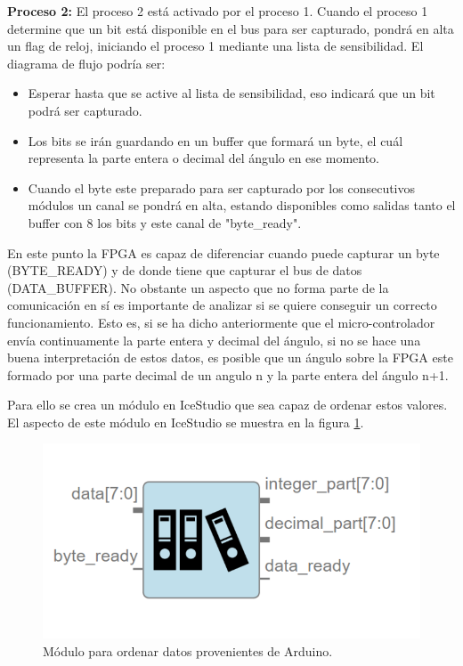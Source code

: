 \textbf{Proceso 2:} El proceso 2 está activado por el proceso 1. Cuando el proceso 1 determine que un bit está disponible en el bus para ser capturado, pondrá en alta un flag de reloj, iniciando el proceso 1 mediante una lista de sensibilidad. El diagrama de flujo podría ser:

\begin{itemize}
	\item Esperar hasta que se active al lista de sensibilidad, eso indicará que un bit podrá ser capturado.
	\item Los bits se irán guardando en un buffer que formará un byte, el cuál representa la parte entera o decimal del ángulo en ese momento.
	\item Cuando el byte este preparado para ser capturado por los consecutivos módulos un canal se pondrá en alta, estando disponibles como salidas tanto el buffer con 8 los bits y este canal de "byte\_ready".
\end{itemize}

En este punto la FPGA es capaz de diferenciar cuando puede capturar un byte (BYTE\_READY) y de donde tiene que capturar el bus de datos (DATA\_BUFFER). No obstante un aspecto que no forma parte de la comunicación en sí es importante de analizar si se quiere conseguir un correcto funcionamiento. Esto es, si se ha dicho anteriormente que el micro-controlador envía continuamente la parte entera y decimal del ángulo, si no se hace una buena interpretación de estos datos, es posible que un ángulo sobre la FPGA este formado por una parte decimal de un angulo n y la parte entera del ángulo n+1. \newline

Para ello se crea un módulo en IceStudio que sea capaz de ordenar estos valores. El aspecto de este módulo en IceStudio se muestra en la figura \ref{fig:arrange_arduino}.

\begin{figure}[H]
	\center
	\includegraphics[scale=0.4]{imagenes/Balancing_robot/arrange_arduino.PNG}
	\caption{Módulo para ordenar datos provenientes de Arduino.}
	\label{fig:arrange_arduino}
\end{figure}

